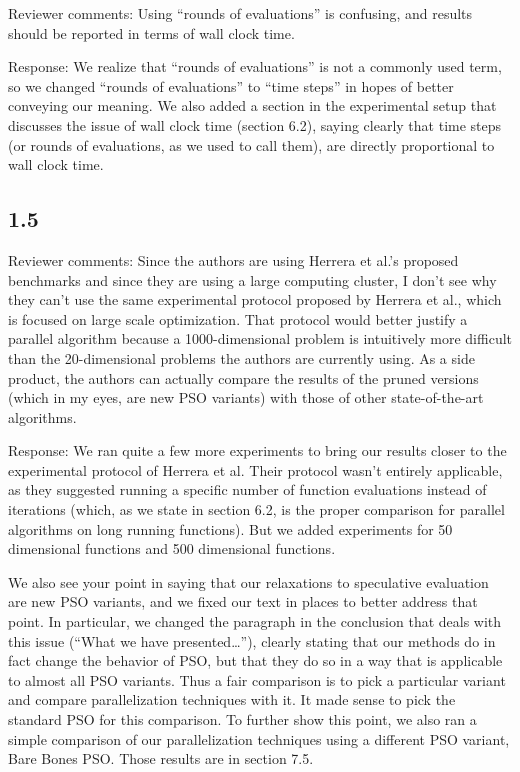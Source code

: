 \documentclass[onecolumn, 12pt]{article}
\begin{document}
Reviewer comments: Using ``rounds of evaluations'' is confusing, and results
should be reported in terms of wall clock time.

Response: We realize that ``rounds of evaluations'' is not a commonly used
term, so we changed ``rounds of evaluations'' to ``time steps'' in hopes of
better conveying our meaning.  We also added a section in the experimental
setup that discusses the issue of wall clock time (section 6.2), saying clearly
that time steps (or rounds of evaluations, as we used to call them), are
directly proportional to wall clock time.

\subsection*{1.5}

Reviewer comments: Since the authors are using Herrera et al.'s proposed
benchmarks and since they are using a large computing cluster, I don't see why
they can't use the same experimental protocol proposed by Herrera et al., which
is focused on large scale optimization. That protocol would better justify a
parallel algorithm because a 1000-dimensional problem is intuitively more
difficult than the 20-dimensional problems the authors are currently using. As
a side product, the authors can actually compare the results of the pruned
versions (which in my eyes, are new PSO variants) with those of other
state-of-the-art algorithms.

Response: We ran quite a few more experiments to bring our results closer to
the experimental protocol of Herrera et al.  Their protocol wasn't entirely
applicable, as they suggested running a specific number of function evaluations
instead of iterations (which, as we state in section 6.2, is the proper
comparison for parallel algorithms on long running functions).  But we added
experiments for 50 dimensional functions and 500 dimensional functions.

We also see your point in saying that our relaxations to speculative evaluation
are new PSO variants, and we fixed our text in places to better address that
point.  In particular, we changed the paragraph in the conclusion that deals
with this issue (``What we have presented\ldots''), clearly stating that our
methods do in fact change the behavior of PSO, but that they do so in a way
that is applicable to almost all PSO variants.  Thus a fair comparison is to
pick a particular variant and compare parallelization techniques with it.  It
made sense to pick the standard PSO for this comparison.  To further show this
point, we also ran a simple comparison of our parallelization techniques using
a different PSO variant, Bare Bones PSO.  Those results are in section 7.5.
\end{document}
